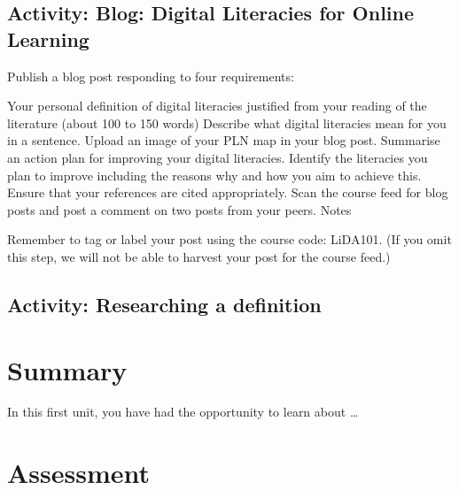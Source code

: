 \documentclass[
]{book}
\theoremstyle{definition}
\theoremstyle{definition}
\theoremstyle{definition}
\theoremstyle{definition}
\theoremstyle{remark}
\begin{document}
\hypertarget{activity-blog-digital-literacies-for-online-learning}{%
\subsection*{Activity: Blog: Digital Literacies for Online Learning}\label{activity-blog-digital-literacies-for-online-learning}}

\begin{reflect}
Publish a blog post responding to four requirements:

Your personal definition of digital literacies justified from your reading of the literature (about 100 to 150 words)
Describe what digital literacies mean for you in a sentence.
Upload an image of your PLN map in your blog post.
Summarise an action plan for improving your digital literacies. Identify the literacies you plan to improve including the reasons why and how you aim to achieve this.
Ensure that your references are cited appropriately.
Scan the course feed for blog posts and post a comment on two posts from your peers.
Notes

Remember to tag or label your post using the course code: LiDA101. (If you omit this step, we will not be able to harvest your post for the course feed.)
\end{reflect}

\hypertarget{activity-researching-a-definition-1}{%
\subsection*{Activity: Researching a definition}\label{activity-researching-a-definition-1}}

\begin{reflect}
\end{reflect}

\hypertarget{summary}{%
\section*{Summary}\label{summary}}

In this first unit, you have had the opportunity to learn about \ldots{}

\hypertarget{assessment}{%
\section*{Assessment}\label{assessment}}
\end{document}
